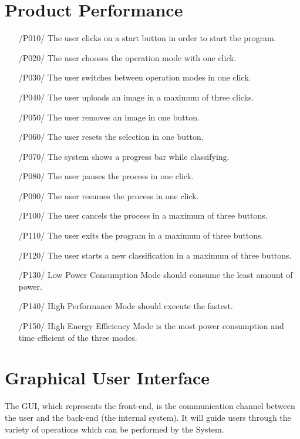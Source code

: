 \documentclass[parskip=full]{scrartcl}
\begin{document}
\pagebreak





\section{Product Performance}

\begin{itemize}
	\item[/P010/] The user clicks on a start button in order to start the program.
	\item[/P020/] The user chooses the operation mode with one click.
	\item[/P030/] The user switches between operation modes in one click.
	\item[/P040/] The user uploads an image in a maximum of three clicks.
	\item[/P050/] The user removes an image in one button.
	\item[/P060/] The user resets the selection in one button.
	\item[/P070/] The system shows a progress bar while classifying.
	\item[/P080/] The user pauses the process in one click.
	\item[/P090/] The user resumes the process in one click.
	\item[/P100/] The user cancels the process in a maximum of three buttons.
	\item[/P110/] The user exits the program in a maximum of three buttons.
	\item[/P120/] The user starts a new classification in a maximum of three buttons.
	\item[/P130/] Low Power Consumption Mode should consume the least amount of power.
	\item[/P140/] High Performance Mode should execute the fastest.
	\item[/P150/] High Energy Efficiency Mode is the most power consumption and time efficient of the three modes.
\end{itemize}

\pagebreak





\section {Graphical User Interface}

The GUI, which represents the front-end, is the communication channel between the user and the back-end (the internal system). It will guide users through the variety of operations which can be performed by the System.
\end{document}
